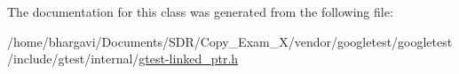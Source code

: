 The documentation for this class was generated from the following file\+:\begin{DoxyCompactItemize}
\item 
/home/bhargavi/\+Documents/\+S\+D\+R/\+Copy\+\_\+\+Exam\+\_\+X/vendor/googletest/googletest/include/gtest/internal/\hyperlink{gtest-linked__ptr_8h}{gtest-\/linked\+\_\+ptr.\+h}\end{DoxyCompactItemize}

